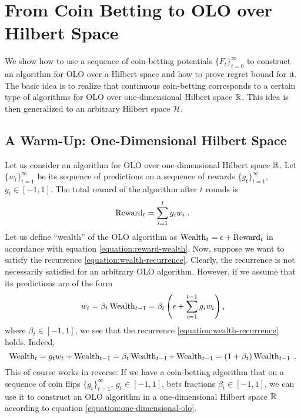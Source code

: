 \section{From Coin Betting to OLO over Hilbert Space}
\label{section:reduction_hilbert}

We show how to use a sequence of coin-betting potentials $\{F_t\}_{t=0}^\infty$
to construct an algorithm for \ac{OLO} over a Hilbert space
and how to prove regret bound for it. The basic idea is to realize that
continuous coin-betting corresponds to a certain type of algorithms
for \ac{OLO} over one-dimensional Hilbert space $\mathbb{R}$.
This idea is then generalized to an arbitrary Hilbert space $\mathcal{H}$.

\subsection{A Warm-Up: One-Dimensional Hilbert Space}
\label{section:one-dimensional-hilbert-space-olo}

Let us consider an algorithm for OLO over one-dimensional Hilbert space $\mathbb{R}$.
Let $\{w_t\}_{t=1}^\infty$ be its sequence of predictions on a sequence of
rewards $\{g_t\}_{t=1}^\infty$, $g_t \in [-1,1]$. The total reward of the
algorithm after $t$ rounds is
$$
\operatorname{Reward}_t = \sum_{i=1}^t g_i w_i \; .
$$
Let us define ``wealth'' of the OLO algorithm as $\operatorname{Wealth}_t = \epsilon +
\operatorname{Reward}_t$ in accordance with equation
\eqref{equation:reward-wealth}. Now, suppose we want to satisfy the recurrence
\eqref{equation:wealth-recurrence}. Clearly, the recurrence is not necessarily
satisfied for an arbitrary OLO algorithm. However, if we assume that its
predictions are of the form \begin{equation}
\label{equation:one-dimensional-olo}
w_t = \beta_t \operatorname{Wealth}_{t-1}
= \beta_t \left(\epsilon+ \sum_{i=1}^{t-1} g_i w_i \right),
\end{equation}
where $\beta_t \in [-1,1]$, we see that the recurrence
\eqref{equation:wealth-recurrence} holds. Indeed,
$$
\operatorname{Wealth}_t
= g_t w_t + \operatorname{Wealth}_{t-1}
= \beta_t \operatorname{Wealth}_{t-1} + \operatorname{Wealth}_{t-1}
= (1+\beta_t) \operatorname{Wealth}_{t-1} \; .
$$
This of course works in reverse: If we have a coin-betting algorithm that on a
sequence of coin flips $\{g_t\}_{t=1}^\infty$, $g_t \in [-1,1]$, bets fractions
$\beta_t \in [-1,1]$, we can use it to construct an OLO algorithm in a
one-dimensional Hilbert space $\mathbb{R}$ according to equation
\eqref{equation:one-dimensional-olo}.

